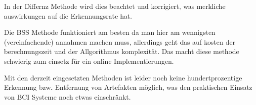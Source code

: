 \documentclass[preprint,12pt]{elsarticle}
\begin{document}
In der Differnz Methode wird dies beachtet und korrigiert, was merkliche auswirkungen auf die Erkennungsrate hat.

Die BSS Methode funktioniert am besten da man hier am wennigsten (vereinfachende) annahmen machen muss, allerdings geht das auf kosten der
 berechnungszeit und der Allgorithmus komplexität.
Das macht diese methode schwierig zum einsetz für ein online Implementierungen.


Mit den derzeit eingesetzten Methoden ist leider noch keine hundertprozentige Erkennung bzw. Entfernung von Artefakten möglich,
was den praktischen Einsatz von BCI Systeme noch etwas einschränkt.
















\end{document}
